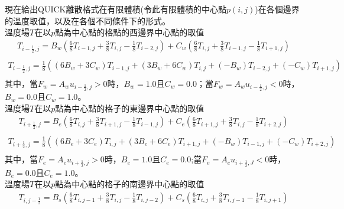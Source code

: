 \documentclass[12pt]{article}
\begin{document}
現在給出QUICK離散格式在有限體積(令此有限體積的中心點$p(i,j)$)在各個邊界的溫度取值，以及在各個不同條件下的形式。\\
\noindent 溫度場$T$在以$p$點為中心點的格點的西邊界中心點的取值\\
\begin{equation}
\begin{split}
  T_{i-\frac{1}{2},j} = B_{w}(\frac{6}{8}T_{i-1,j}+\frac{3}{8}T_{i,j}-\frac{1}{8}T_{i-2,j})+C_{w}(\frac{6}{8}T_{i,j}+\frac{3}{8}T_{i-1,j}-\frac{1}{8}T_{i+1,j})\\
\end{split}
\end{equation}
\begin{equation}
\begin{split}
  T_{i-\frac{1}{2},j} = \frac{1}{8}\left((6B_{w}+3C_{w})T_{i-1,j}+(3B_{w}+6C_{w})T_{i,j}+(-B_{w})T_{i-2,j}+(-C_{w})T_{i+1,j}\right)\\
\end{split}
\end{equation}
\noindent 其中，當$F_{w} = A_{w}u_{i-\frac{1}{2},j}>0$時，$B_{w} = 1.0$且$C_{w} = 0.0$；當$F_{w} = A_{w}u_{i-\frac{1}{2},j}<0$時，$B_{w} = 0.0$且$C_{w} = 1.0$。\\
\noindent 溫度場$T$在以$p$點為中心點的格子的東邊界中心點的取值\\
\begin{equation}
\begin{split}
  T_{i+\frac{1}{2},j} = B_{e}(\frac{6}{8}T_{i,j}+\frac{3}{8}T_{i+1,j}-\frac{1}{8}T_{i-1,j})+C_{e}(\frac{6}{8}T_{i+1,j}+\frac{3}{8}T_{i,j}-\frac{1}{8}T_{i+2,j})\\
\end{split}
\end{equation}
\begin{equation}
\begin{split}
    T_{i+\frac{1}{2},j} = \frac{1}{8}\left((6B_{e}+3C_{e})T_{i,j}+(3B_{e}+6C_{e})T_{i+1,j}+(-B_{w})T_{i-1,j}+(-C_{w})T_{i+2,j}\right)\\
\end{split}
\end{equation}
\noindent 其中，當$F_{e} = A_{e}u_{i+\frac{1}{2},j}>0$時，$B_{e} = 1.0$且$C_{e} = 0.0$;當$F_{e} = A_{e}u_{i+\frac{1}{2},J}<0$時，$B_{e} = 0.0$且$C_{e} = 1.0$。\\
\noindent 溫度場$T$在以$p$點為中心點的格子的南邊界中心點的取值\\
\begin{equation}
\begin{split}
  T_{i,j-\frac{1}{2}} = B_{s}(\frac{6}{8}T_{i,j-1}+\frac{3}{8}T_{i,j}-\frac{1}{8}T_{i,j-2})+C_{s}(\frac{6}{8}T_{i,j}+\frac{3}{8}T_{i,j-1}-\frac{1}{8}T_{i,j+1})
\end{split}
\end{equation}
\end{document}
